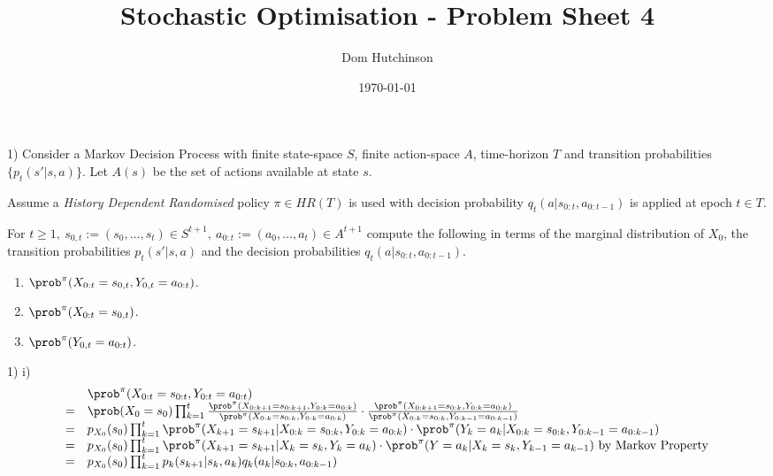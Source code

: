 \documentclass[11pt,a4paper]{article}
\begin{document}

\title{Stochastic Optimisation - Problem Sheet 4}
\author{Dom Hutchinson}
\date{\today}
\maketitle


\begin{question}{1)}
  Consider a Markov Decision Process with finite state-space $S$, finite action-space $A$, time-horizon $T$ and transition probabilities $\{p_t(s'|s,a)\}$. Let $A(s)$ be the set of actions available at state $s$.
  \par Assume a \textit{History Dependent Randomised} policy $\pi\in HR(T)$ is used with decision probability $q_t(a|s_{0:t},a_{0:t-1})$ is applied at epoch $t\in T$.
  \par For $t\geq1,\ s_{0,t}:=(s_0,\dots,s_t)\in S^{t+1},\ a_{0:t}:=(a_0,\dots,a_t)\in A^{t+1}$ compute the following in terms of the marginal distribution of $X_0$, the transition probabilities $p_t(s'|s,a)$ and the decision probabilities $q_t(a|s_{0:t},a_{0:t-1})$.
  \begin{enumerate}
    \item $\prob^\pi(X_{0:t}=s_{0,t},Y_{0,t}=a_{0:t})$.
    \item $\prob^\pi(X_{0:t}=s_{0,t})$.
    \item $\prob^\pi(Y_{0,t}=a_{0:t})$.
  \end{enumerate}
\end{question}

\begin{answer}{1) i)}
  \[\begin{array}{rl}
    &\prob^\pi(X_{0:t}=s_{0:t},Y_{0:t}=a_{0:t})\\
    =&\prob(X_0=s_0)\prod_{k=1}^t\frac{\prob^\pi(X_{0:k+1}=s_{0:k+1},Y_{0:k}=a_{0:k})}{\prob^\pi(X_{0:k}=s_{0:k},Y_{0:k}=a_{0:k})}\cdot\frac{\prob^\pi(X_{0:k+1}=s_{0:k},Y_{0:k}=a_{0:k})}{\prob^\pi(X_{0:k}=s_{0:k},Y_{0:k-1}=a_{0:k-1})}\\
    =&p_{X_0}(s_0)\prod_{k=1}^t\prob^\pi(X_{k+1}=s_{k+1}|X_{0:k}=s_{0:k},Y_{0:k}=a_{0:k})\cdot\prob^\pi(Y_k=a_k|X_{0:k}=s_{0:k},Y_{0:k-1}=a_{0:k-1})\\
    =&p_{X_0}(s_0)\prod_{k=1}^t\prob^\pi(X_{k+1}=s_{k+1}|X_k=s_k,Y_k=a_k)\cdot\prob^\pi(Y=a_k|X_k=s_k,Y_{k-1}=a_{k-1})\text{ by Markov Property}\\
    =&p_{X_0}(s_0)\prod_{k=1}^tp_k(s_{k+1}|s_k,a_k)q_k(a_k|s_{0:k},a_{0:k-1})
  \end{array}\]
\end{answer}
\end{document}
